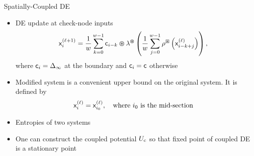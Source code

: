 \documentclass{beamer}
\newlength{\twocolwid}
\begin{document}
\begin{frame}
\begin{columns}[t]
\begin{column}{\twocolwid}
    \vspace{2cm}
    \begin{block}{Spatially-Coupled DE}
      \begin{itemize}
      \item\vspace{0.75cm} DE update at check-node inputs
        \begin{align*}
          \label{equation:scde_update_1_ldpc}
          \mathsf{x}_{i}^{(\ell+1)} = \frac{1}{w} \sum_{k=0}^{w-1} \mathsf{c}_{i-k} \varoast \lambda^{\varoast} \left(  \frac{1}{w} \sum_{j=0}^{w-1} \rho^{\boxast} \left( \mathsf{x}_{i-k+j}^{(\ell)} \right) \right) ,
        \end{align*}
        where $\mathsf{c}_i=\Delta_\infty$ at the boundary and $\mathsf{c}_i=\mathsf{c}$ otherwise
      \item\vspace{0.75cm} \alert{Modified system} is a convenient upper bound on the original system.
        It is defined by
        \begin{align*}
          \mathsf{x}_{i}^{(\ell)} = \mathsf{x}_{i_0}^{(\ell)},  \quad \text{where $i_0$ is the mid-section}
        \end{align*}
      \item\vspace{0.75cm} Entropies of two systems
        \vspace{1cm}
        \begin{center}
          \resizebox{18cm}{9cm}{
            
          }
        \end{center}
      \item One can construct the \alert{coupled potential} $U_\mathrm{c}$ so that fixed point of coupled DE is a stationary point
      \end{itemize}
    \end{block}


\end{column}
\end{columns}
\end{frame}
\end{document}

